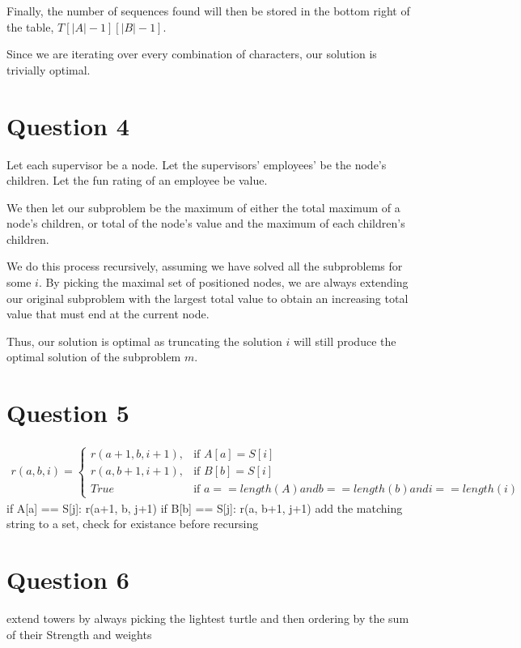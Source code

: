 \documentclass{article}
\begin{document}
Finally, the number of sequences found will then be stored in the bottom right of the table, $T[|A|-1][|B|-1]$.

Since we are iterating over every combination of characters, our solution is trivially optimal.

\section*{Question 4}
Let each supervisor be a node.
Let the supervisors' employees' be the node's children.
Let the fun rating of an employee be value.

We then let our subproblem be the maximum of either the total maximum of a node's children, or total of the node's value and the maximum of each children's children.

We do this process recursively, assuming we have solved all the subproblems for some $i$. By picking the maximal set of positioned nodes, we are always extending our original subproblem with the largest total value to obtain an increasing total value that must end at the current node.

Thus, our solution is optimal as truncating the solution $i$ will still produce the optimal solution of the subproblem $m$.

\section*{Question 5}
\begin{align*}
r(a, b, i) =
\begin{cases}
    r(a+1, b, i+1), & \text{if } A[a] = S[i]\\
    r(a, b+1, i+1), & \text{if } B[b] = S[i]\\
    True            & \text{if } a == length(A) and b == length(b) and i== length(i)

\end{cases}
\end{align*}
if A[a] == S[j]:
    r(a+1, b, j+1)
if B[b] == S[j]:
    r(a, b+1, j+1)
add the matching string to a set, check for existance before recursing

\section*{Question 6}
extend towers by always picking the lightest turtle and then ordering by the sum of their Strength and weights
\end{document}

